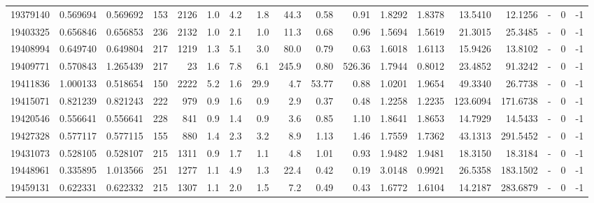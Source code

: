 \begin{tabular}{rrrrrrrrrrrrrrrlrr}
  19379140 & 0.569694 &   0.569692 &  153 & 2126 &      1.0 &      4.2 &     1.8 &     44.3 &       0.58 &        0.91 &  1.8292 &  1.8378 &   13.5410 &   12.1256 &             - &        0 &         -1 \\
  19403325 & 0.656846 &   0.656853 &  236 & 2132 &      1.0 &      2.1 &     1.0 &     11.3 &       0.68 &        0.96 &  1.5694 &  1.5619 &   21.3015 &   25.3485 &             - &        0 &         -1 \\
  19408994 & 0.649740 &   0.649804 &  217 & 1219 &      1.3 &      5.1 &     3.0 &     80.0 &       0.79 &        0.63 &  1.6018 &  1.6113 &   15.9426 &   13.8102 &             - &        0 &         -1 \\
  19409771 & 0.570843 &   1.265439 &  217 &   23 &      1.6 &      7.8 &     6.1 &    245.9 &       0.80 &      526.36 &  1.7944 &  0.8012 &   23.4852 &   91.3242 &             - &        0 &         -1 \\
  19411836 & 1.000133 &   0.518654 &  150 & 2222 &      5.2 &      1.6 &    29.9 &      4.7 &      53.77 &        0.88 &  1.0201 &  1.9654 &   49.3340 &   26.7738 &             - &        0 &         -1 \\
  19415071 & 0.821239 &   0.821243 &  222 &  979 &      0.9 &      1.6 &     0.9 &      2.9 &       0.37 &        0.48 &  1.2258 &  1.2235 &  123.6094 &  171.6738 &             - &        0 &         -1 \\
  19420546 & 0.556641 &   0.556641 &  228 &  841 &      0.9 &      1.4 &     0.9 &      3.6 &       0.85 &        1.10 &  1.8641 &  1.8653 &   14.7929 &   14.5433 &             - &        0 &         -1 \\
  19427328 & 0.577117 &   0.577115 &  155 &  880 &      1.4 &      2.3 &     3.2 &      8.9 &       1.13 &        1.46 &  1.7559 &  1.7362 &   43.1313 &  291.5452 &             - &        0 &         -1 \\
  19431073 & 0.528105 &   0.528107 &  215 & 1311 &      0.9 &      1.7 &     1.1 &      4.8 &       1.01 &        0.93 &  1.9482 &  1.9481 &   18.3150 &   18.3184 &             - &        0 &         -1 \\
  19448961 & 0.335895 &   1.013566 &  251 & 1277 &      1.1 &      4.9 &     1.3 &     22.4 &       0.42 &        0.19 &  3.0148 &  0.9921 &   26.5358 &  183.1502 &             - &        0 &         -1 \\
  19459131 & 0.622331 &   0.622332 &  215 & 1307 &      1.1 &      2.0 &     1.5 &      7.2 &       0.49 &        0.43 &  1.6772 &  1.6104 &   14.2187 &  283.6879 &             - &        0 &         -1 \\

\end{tabular}
